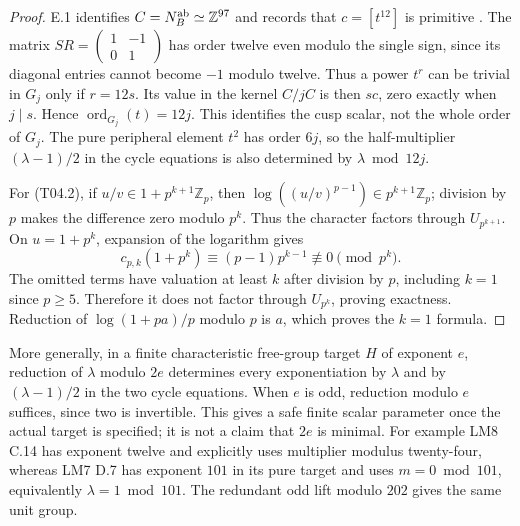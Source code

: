 \documentclass[11pt,a4paper]{article}
\begin{document}
\begin{proof}
E.1 identifies $C=N_B^{\rm ab}\simeq\mathbb Z^{97}$ and records that
$c=[t^{12}]$ is primitive \cite[E.1, proof; E.4]{LM7run}.
The matrix $SR=\left(\begin{smallmatrix}1&-1\\0&1\end{smallmatrix}\right)$
has order twelve even modulo the single sign, since its diagonal
entries cannot become $-1$ modulo twelve. Thus a power $t^r$ can be trivial
in $G_j$ only if $r=12s$. Its value in the kernel $C/jC$ is then
$sc$, zero exactly when $j\mid s$. Hence $\operatorname{ord}_{G_j}(t)=12j$.
This identifies the cusp scalar, not the whole order of $G_j$.
The pure peripheral element $t^2$ has order $6j$, so the half-multiplier
$(\lambda-1)/2$ in the cycle equations is also determined by
$\lambda\bmod12j$.

For (T04.2), if $u/v\in1+p^{k+1}\mathbb Z_p$, then
$\log((u/v)^{p-1})\in p^{k+1}\mathbb Z_p$; division by $p$ makes
the difference zero modulo $p^k$. Thus the character factors through
$U_{p^{k+1}}$. On $u=1+p^k$, expansion of the logarithm gives
\[
 c_{p,k}(1+p^k)\equiv(p-1)p^{k-1}\not\equiv0\pmod{p^k}.
\]
The omitted terms have valuation at least $k$ after division by $p$,
including $k=1$ since $p\geq5$. Therefore it does not factor through
$U_{p^k}$, proving exactness. Reduction of
$\log(1+pa)/p$ modulo $p$ is $a$, which proves the $k=1$ formula.
\end{proof}

More generally, in a finite characteristic free-group target $H$ of
exponent $e$, reduction of $\lambda$ modulo $2e$ determines every
exponentiation by $\lambda$ and by $(\lambda-1)/2$ in the two cycle equations.
When $e$ is odd, reduction modulo $e$ suffices, since two is invertible.
This gives a safe finite scalar parameter once the actual target is
specified; it is not a claim that $2e$ is minimal. For example LM8
C.14 has exponent twelve and explicitly uses multiplier modulus
twenty-four, whereas LM7 D.7 has exponent $101$ in its pure target
and uses $m=0\bmod101$, equivalently $\lambda=1\bmod101$.
The redundant odd lift modulo $202$ gives the same unit group.
\end{document}
